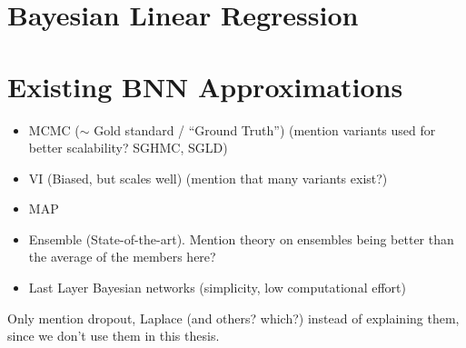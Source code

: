 \documentclass[../thesis.tex]{subfiles}
\begin{document}
\section{Bayesian Linear Regression}

\section{Existing BNN Approximations}
\begin{itemize}
    \item MCMC ($\sim$ Gold standard / ``Ground Truth'') (mention variants used for better scalability? SGHMC, SGLD)
    \item VI (Biased, but scales well) (mention that many variants exist?)
    \item MAP
    \item Ensemble (State-of-the-art). Mention theory on ensembles being better than the average of the members here?
    \item Last Layer Bayesian networks (simplicity, low computational effort)
\end{itemize}
Only mention dropout, Laplace (and others? which?) instead of explaining them, since we don't use them in this thesis.
\end{document}
